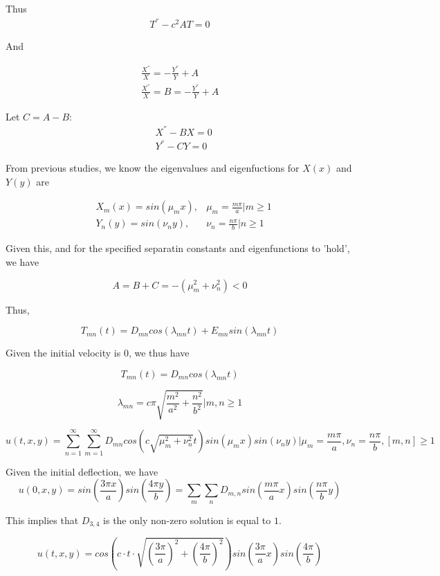 \documentclass{article}
\begin{document}
Thus
\begin{align*}
T^{''}-c^2AT=0
\end{align*}

And

\begin{align*}
\frac{X^{''}}{X} = - \frac{Y^{''}}{Y} + A\\
\frac{X^{''}}{X} = B = - \frac{Y^{''}}{Y} + A
\end{align*}

Let $C = A-B$:
\begin{align*}
&X^{''} - BX=0\\
&Y^{''} - CY=0
\end{align*}

From previous studies, we know the eigenvalues and eigenfuctions for $X(x)$ and $Y(y)$ are

\begin{align*}
&X_m(x) = sin\left( \mu_mx\right), & \mu_m = \frac{m\pi}{a}\Bigr| m \geq 1\\
&Y_n(y) = sin\left( \nu_ny\right), & \nu_n = \frac{n\pi}{b}\Bigr| n \geq 1
\end{align*}

Given this, and for the specified separatin constants and eigenfunctions to 'hold', we have

$$A=B+C=-(\mu_m^2+\nu_n^2) <0$$

Thus,

$$T_{mn}(t)=D_{mn}cos\left(\lambda_{mn}t\right)+E_{mn}sin\left(\lambda_{mn}t\right)$$

Given the initial velocity is 0, we thus have

$$T_{mn}(t)=D_{mn}cos\left(\lambda_{mn}t\right)$$

$$\lambda_{mn}=c \pi \sqrt{\frac{m^2}{a^2}+\frac{n^2}{b^2}}\Bigr| m,n \geq 1$$

$$u(t,x,y) = \sum_{n=1}^{\infty} \sum_{m=1}^{\infty} D_{mn}cos\left(c\sqrt{\mu_m^2 + \nu_n^2}t\right) sin\left( \mu_mx\right) sin\left( \nu_ny\right)\Bigr|\mu_m = \frac{m\pi}{a}, \nu_n = \frac{n \pi}{b}, [m,n]\geq 1$$


Given the initial deflection, we have
$$u(0,x,y) = sin\left(\frac{3\pi x}{a}\right)sin\left(\frac{4\pi y}{b}\right) = \sum_{m} \sum_{n} D_{m,n}sin\left( \frac{m\pi}{a} x\right) sin\left( \frac{n \pi}{b} y\right)$$

This implies that $D_{3,4}$ is the only non-zero solution is equal to $1$.

$$u(t,x,y) = cos\left( c \cdot t \cdot \sqrt{ \left(\frac{3 \pi}{a}\right)^2 + \left(\frac{4 \pi}{b}\right)^2}\right)sin\left(\frac{3\pi}{a}x\right)sin\left(\frac{4\pi}{b}\right)$$
\end{document}
